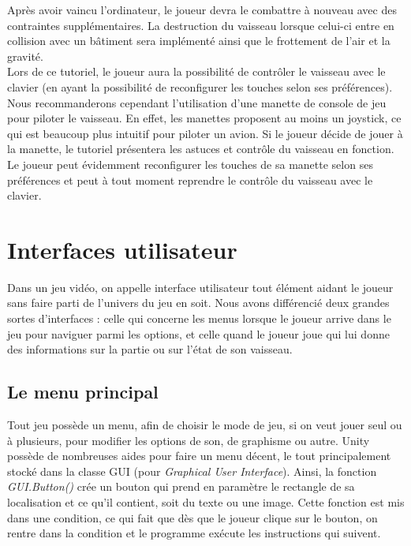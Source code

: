 \documentclass[12pt, titlepage]{article}
\begin{document}
\begin{spacing}{1.5}
Après avoir vaincu l'ordinateur, le joueur devra le combattre à nouveau avec des contraintes supplémentaires. La destruction du vaisseau lorsque celui-ci entre en collision avec un bâtiment sera implémenté ainsi que le frottement de l'air et la gravité. \\

Lors de ce tutoriel, le joueur aura la possibilité de contrôler le vaisseau avec le clavier (en ayant la possibilité de reconfigurer les touches selon ses préférences). Nous recommanderons cependant l'utilisation d'une manette de console de jeu pour piloter le vaisseau. En effet, les manettes proposent au moins un joystick, ce qui est beaucoup plus intuitif pour piloter un avion. Si le joueur décide de jouer à la manette, le tutoriel présentera les astuces et contrôle du vaisseau en fonction. Le joueur peut évidemment reconfigurer les touches de sa manette selon ses préférences et peut à tout moment reprendre le contrôle du vaisseau avec le clavier.\\

\newpage
\section{Interfaces utilisateur}

Dans un jeu vidéo, on appelle interface utilisateur tout élément aidant le joueur sans faire parti de l'univers du jeu en soit. Nous avons différencié deux grandes sortes d'interfaces : celle qui concerne les menus lorsque le joueur arrive dans le jeu pour naviguer parmi les options, et celle quand le joueur joue qui lui donne des informations sur la partie ou sur l'état de son vaisseau.

\subsection{Le menu principal}

Tout jeu possède un menu, afin de choisir le mode de jeu, si on veut jouer seul ou à plusieurs, pour modifier les options de son, de graphisme ou autre. Unity possède de nombreuses aides pour faire un menu décent, le tout principalement stocké dans la classe GUI (pour \textit{Graphical User Interface}). Ainsi, la fonction \textit{GUI.Button()} crée un bouton qui prend en paramètre le rectangle de sa localisation et ce qu'il contient, soit du texte ou une image. Cette fonction est mis dans une condition, ce qui fait que dès que le joueur clique sur le bouton, on rentre dans la condition et le programme exécute les instructions qui suivent.\\


\end{spacing}
\end{document}
